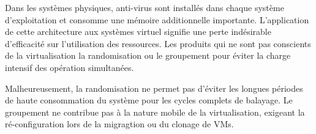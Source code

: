 Dans les systèmes physiques, anti-virus sont installés dans chaque système d'exploitation et consomme une mémoire additionnelle importante. L'application de cette architecture aux systèmes virtuel signifie une perte indésirable d'efficacité sur l'utilisation des ressources. Les produits qui ne sont pas conscients  de la virtualisation la randomisation ou le groupement pour éviter la charge intensif des opération simultanées.

Malheureusement, la randomisation ne permet pas d'éviter les longues périodes de haute consommation du système pour les cycles complets de balayage. Le groupement ne contribue pas à la nature mobile de la virtualisation, exigeant la ré-configuration lors de la migragtion ou du clonage de VMs.



